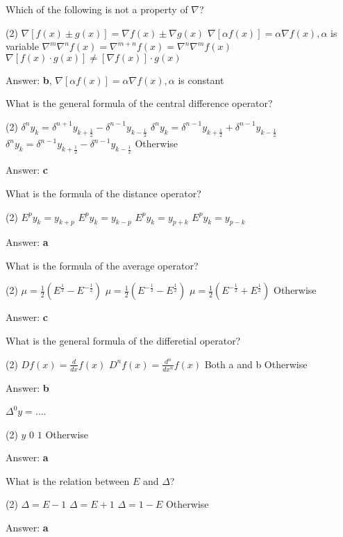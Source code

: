 \documentclass{exam}
\begin{document}
\begin{questions}
	\question Which of the following is not a property of $\nabla$?
	\begin{tasks}(2)
		\task $\nabla[f(x) \pm g(x)]=\nabla f(x) \pm \nabla g(x)$
		\task $\nabla[\alpha f(x)] = \alpha \nabla f(x), \alpha$ is variable
		\task $\nabla^m \nabla^n f(x) = \nabla^{m+n} f(x) = \nabla^n \nabla^m f(x)$
		\task $\nabla[f(x) \cdot g(x)] \neq [\nabla f(x)] \cdot g(x)$
	\end{tasks}
	Answer: \textbf{b}, $\nabla[\alpha f(x)] = \alpha \nabla f(x), \alpha$ is constant

	\question What is the general formula of the central difference operator?
	\begin{tasks}(2)
		\task $\delta^n y_k = \delta^{n+1} y_{k+\frac{1}{2}} - \delta^{n-1} y_{k-\frac{1}{2}}$
		\task $\delta^n y_k = \delta^{n-1} y_{k+\frac{1}{2}} + \delta^{n-1} y_{k-\frac{1}{2}}$
		\task $\delta^n y_k = \delta^{n-1} y_{k+\frac{1}{2}} - \delta^{n-1} y_{k-\frac{1}{2}}$
		\task Otherwise
	\end{tasks}
	Answer: \textbf{c}

	\question What is the formula of the distance operator?
	\begin{tasks}(2)
		\task $E^p y_k = y_{k+p}$
		\task $E^p y_k = y_{k-p}$
		\task $E^p y_k = y_{p+k}$
		\task $E^p y_k = y_{p-k}$
	\end{tasks}
	Answer: \textbf{a}

	\question What is the formula of the average operator?
	\begin{tasks}(2)
		\task $\mu = \frac{1}{2}(E^{\frac{1}{2}} - E^{-\frac{1}{2}})$
		\task $\mu = \frac{1}{2}(E^{-\frac{1}{2}} - E^{\frac{1}{2}})$
		\task $\mu = \frac{1}{2}(E^{-\frac{1}{2}} + E^{\frac{1}{2}})$
		\task Otherwise
	\end{tasks}
	Answer: \textbf{c}

	\question What is the general formula of the differetial operator?
	\begin{tasks}(2)
		\task $D f(x) = \frac{d}{dx} f(x)$
		\task $D^n f(x) = \frac{d^n}{dx^n} f(x)$
		\task Both a and b
		\task Otherwise
	\end{tasks}
	Answer: \textbf{b}

	\question $\Delta^0 y = \dots$.
	\begin{tasks}(2)
		\task $y$
		\task $0$
		\task $1$
		\task Otherwise
	\end{tasks}
	Answer: \textbf{a}

	\question What is the relation between $E$ and $\Delta$?
	\begin{tasks}(2)
		\task $\Delta = E - 1$
		\task $\Delta = E + 1$
		\task $\Delta = 1 - E$
		\task Otherwise
	\end{tasks}
	Answer: \textbf{a}


\end{questions}
\end{document}
